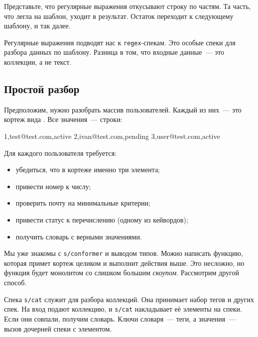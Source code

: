 Представьте, что регулярные выражения откусывают строку по частям. Та часть, что
легла на шаблон, уходит в результат. Остаток переходит к следующему шаблону, и
так далее.

Регулярные выражения подводят нас к \verb|regex|-спекам. Это особые спеки для
разбора данных по шаблону. Разница в том, что входные данные~--- это коллекции, а не
текст.


\subsection{Простой разбор}

Предположим, нужно разобрать массив пользователей. Каждый из них~--- это кортеж
вида . Все значения~--- строки:

\begin{english}
  \begin{text}
1,test@test.com,active
2,ivan@test.com,pending
3,user@test.com,active
  \end{text}
\end{english}

Для каждого пользователя требуется:

\begin{itemize}

\item
  убедиться, что в кортеже именно три элемента;

\item
  привести номер к числу;

\item
  проверить почту на минимальные критерии;

\item
  привести статус к перечислению (одному из кейвордов);

\item
  получить словарь с верными значениями.

\end{itemize}

Мы уже знакомы с \verb|s/conformer| и выводом типов. Можно написать функцию,
которая примет кортеж целиком и выполнит действия выше. Это несложно, но функция
будет монолитом со слишком большим \emph{скоупом}. Рассмотрим другой способ.


Спека \verb|s/cat| служит для разбора коллекций. Она принимает набор тегов и
других спек. На вход подают коллекцию, и \verb|s/cat| накладывает её элементы на
спеки. Если они совпали, получим словарь. Ключи словаря~--- теги, а значения~---
вызов дочерней спеки с элементом.

